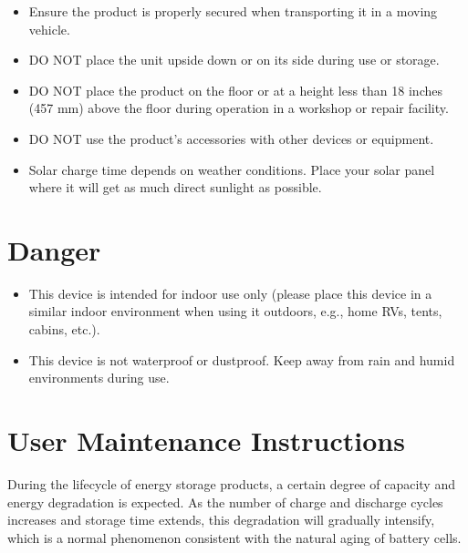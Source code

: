 \documentclass[a4paper,10pt,twoside,openany,english]{sphinxhowto}
\begin{document}
\begin{safetytwocol}
\begin{itemize}
\item {} 
\sphinxAtStartPar
Ensure the product is properly secured when transporting it in a moving vehicle.

\item {} 
\sphinxAtStartPar
DO NOT place the unit upside down or on its side during use or storage.

\item {} 
\sphinxAtStartPar
DO NOT place the product on the floor or at a height less than 18 inches (457 mm) above the floor during operation in a workshop or repair facility.

\item {} 
\sphinxAtStartPar
DO NOT use the product’s accessories with other devices or equipment.

\item {} 
\sphinxAtStartPar
Solar charge time depends on weather conditions. Place your solar panel where it will get as much direct sunlight as possible.

\end{itemize}

\end{safetytwocol}





\section{Danger}
\label{\detokenize{index:danger}}\begin{itemize}
\item {} 
\sphinxAtStartPar
This device is intended for indoor use only (please place this device in a similar indoor environment when using it outdoors, e.g., home RVs, tents, cabins, etc.).

\item {} 
\sphinxAtStartPar
This device is not waterproof or dustproof. Keep away from rain and humid environments during use.

\end{itemize}


\section{User Maintenance Instructions}
\label{\detokenize{index:user-maintenance-instructions}}
\sphinxAtStartPar
During the lifecycle of energy storage products, a certain degree of capacity and energy degradation is expected.
As the number of charge and discharge cycles increases and storage time extends, this degradation will gradually intensify,
which is a normal phenomenon consistent with the natural aging of battery cells.
\end{document}
